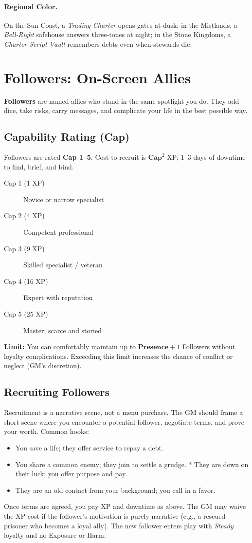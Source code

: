 \paragraph{Regional Color.}
On the Sun Coast, a \emph{Trading Charter} opens gates at dusk; in the Mistlands, a \emph{Bell-Right} safehouse answers three-tones at night; in the Stone Kingdoms, a \emph{Charter-Script Vault} remembers debts even when stewards die.

\section{Followers: On-Screen Allies}

\textbf{Followers} are named allies who stand in the same spotlight you do. They add dice, take risks, carry messages, and complicate your life in the best possible way.

\subsection*{Capability Rating (Cap)}
Followers are rated \textbf{Cap 1–5}. Cost to recruit is \(\textbf{Cap}^2\) XP; 1–3 days of downtime to find, brief, and bind.
\begin{description}
  \item[Cap 1 (1 XP)] Novice or narrow specialist
  \item[Cap 2 (4 XP)] Competent professional
  \item[Cap 3 (9 XP)] Skilled specialist / veteran
  \item[Cap 4 (16 XP)] Expert with reputation
  \item[Cap 5 (25 XP)] Master; scarce and storied
\end{description}
\textbf{Limit:} You can comfortably maintain up to \(\textbf{Presence} + 1\) Followers without loyalty complications. Exceeding this limit increases the chance of conflict or neglect (GM’s discretion). 

\subsection*{Recruiting Followers}
Recruitment is a narrative scene, not a menu purchase. The GM should frame a short scene where you encounter a potential follower, negotiate terms, and prove your worth. Common hooks:
\begin{itemize}
  \item You save a life; they offer service to repay a debt.
  \item You share a common enemy; they join to settle a grudge.
  * They are down on their luck; you offer purpose and pay.
  \item They are an old contact from your background; you call in a favor.
\end{itemize}
Once terms are agreed, you pay XP and downtime as above. The GM may waive the XP cost if the follower’s motivation is purely narrative (e.g., a rescued prisoner who becomes a loyal ally). The new follower enters play with \emph{Steady} loyalty and no Exposure or Harm.


